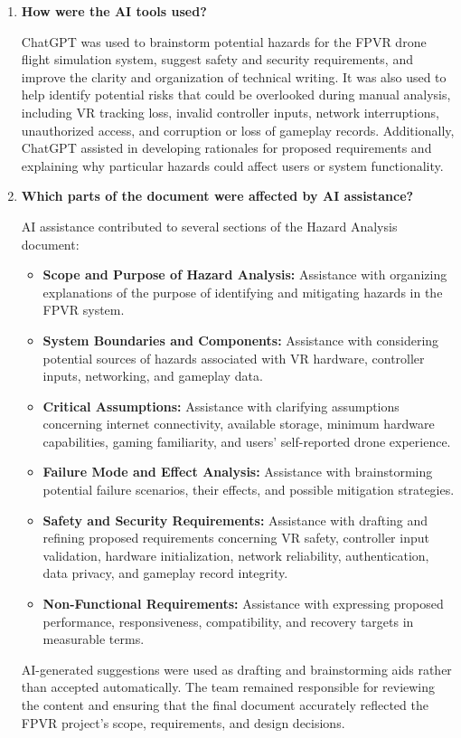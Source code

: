 \documentclass{article}
\begin{document}
\begin{enumerate}
    \item \textbf{How were the AI tools used?}

    ChatGPT was used to brainstorm potential hazards for the FPVR drone flight simulation system, suggest safety and security requirements, and improve the clarity and organization of technical writing. It was also used to help identify potential risks that could be overlooked during manual analysis, including VR tracking loss, invalid controller inputs, network interruptions, unauthorized access, and corruption or loss of gameplay records. Additionally, ChatGPT assisted in developing rationales for proposed requirements and explaining why particular hazards could affect users or system functionality.

    \item \textbf{Which parts of the document were affected by AI assistance?}

    AI assistance contributed to several sections of the Hazard Analysis document:
    \begin{itemize}
        \item \textbf{Scope and Purpose of Hazard Analysis:} Assistance with organizing explanations of the purpose of identifying and mitigating hazards in the FPVR system.
        \item \textbf{System Boundaries and Components:} Assistance with considering potential sources of hazards associated with VR hardware, controller inputs, networking, and gameplay data.
        \item \textbf{Critical Assumptions:} Assistance with clarifying assumptions concerning internet connectivity, available storage, minimum hardware capabilities, gaming familiarity, and users' self-reported drone experience.
        \item \textbf{Failure Mode and Effect Analysis:} Assistance with brainstorming potential failure scenarios, their effects, and possible mitigation strategies.
        \item \textbf{Safety and Security Requirements:} Assistance with drafting and refining proposed requirements concerning VR safety, controller input validation, hardware initialization, network reliability, authentication, data privacy, and gameplay record integrity.
        \item \textbf{Non-Functional Requirements:} Assistance with expressing proposed performance, responsiveness, compatibility, and recovery targets in measurable terms.
    \end{itemize}

    AI-generated suggestions were used as drafting and brainstorming aids rather than accepted automatically. The team remained responsible for reviewing the content and ensuring that the final document accurately reflected the FPVR project's scope, requirements, and design decisions.
\end{enumerate}
\end{document}
